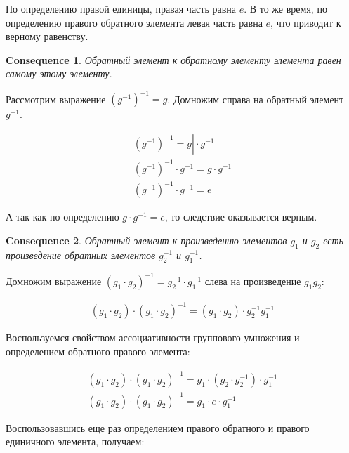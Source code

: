 \documentclass[10pt,a4paper]{article}
\newtheorem{cons}{Consequence}
\begin{document}
			По определению правой единицы, правая часть равна $e$. В то же 
			время, по определению правого обратного элемента левая часть равна 
			$e$, что приводит к верному равенству.
			
		\begin{cons}
			Обратный элемент к обратному элементу элемента равен самому этому
			элементу.
		\end{cons}
		
			Рассмотрим выражение $\left(g^{-1}\right)^{-1} = g$. 
			Домножим справа на обратный элемент $g^{-1}$.
			
			\begin{align}
				\left(g^{-1}\right)^{-1} = g \left.\right| \cdot g^{-1} \\
				\left(g^{-1}\right)^{-1}\cdot g^{-1} = g\cdot g^{-1}\\
				\left(g^{-1}\right)^{-1}\cdot g^{-1} = e
			\end{align}
			
			А так как по определению $g \cdot g^{-1} = e$, то следствие 
			оказывается верным.
			
		\begin{cons}
			Обратный элемент к произведению элементов $g_{1}$ и $g_{2}$ есть 
			произведение обратных элементов $g_{2}^{-1}$ и $g_{1}^{-1}$.
		\end{cons}
		
			Домножим выражение $\left(g_{1}\cdot g_{2}\right)^{-1} = 
			g_{2}^{-1}\cdot g_{1}^{-1}$ слева на произведение $g_{1}g_{2}$:
			
			
			\begin{align}
				\left(g_{1}\cdot g_{2}\right)\cdot 
				\left(g_{1}\cdot g_{2}\right)^{-1} = 
				\left(g_{1}\cdot g_{2}\right) \cdot g_{2}^{-1}g_{1}^{-1}
			\end{align}
			
			Воспользуемся свойством ассоциативности группового умножения и 
			определением обратного правого элемента:
			
			\begin{align}
				\left(g_{1}\cdot g_{2}\right)\cdot 
				\left(g_{1}\cdot g_{2}\right)^{-1} = 
				g_{1}\cdot \left(g_{2} \cdot g_{2}^{-1}\right)\cdot g_{1}^{-1}
				\\
				\left(g_{1}\cdot g_{2}\right)\cdot 
				\left(g_{1}\cdot g_{2}\right)^{-1} = 
				g_{1}\cdot e \cdot g_{1}^{-1}
			\end{align}
			
			Воспользовавшись еще раз определением правого обратного и правого
			единичного элемента, получаем:
			
\end{document}
